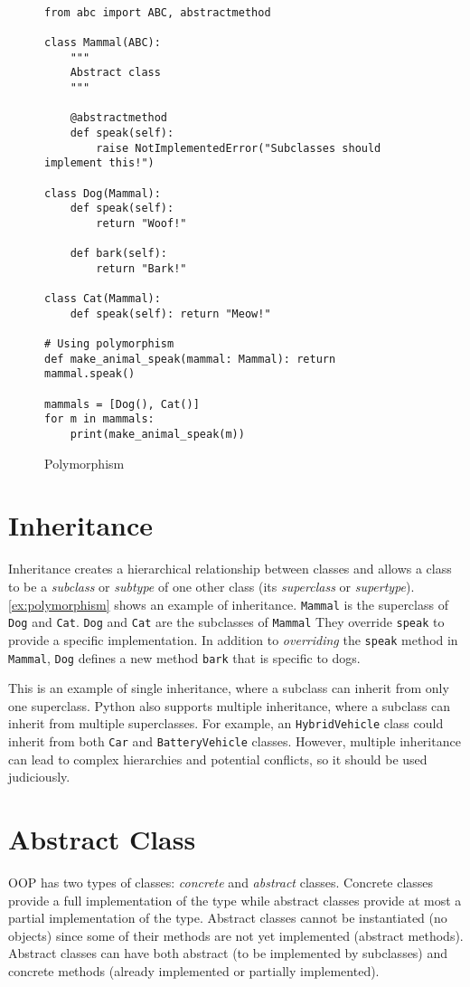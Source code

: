 \documentclass[oneside,11pt,dvipsnames]{book}
\newcommand{\code}[1]{\texttt{#1}}
\begin{document}
\begin{figure}
\begin{lstlisting}

from abc import ABC, abstractmethod

class Mammal(ABC):
    """
    Abstract class
    """
    
    @abstractmethod
    def speak(self):
        raise NotImplementedError("Subclasses should implement this!")

class Dog(Mammal):
    def speak(self):
        return "Woof!"

    def bark(self):
        return "Bark!"

class Cat(Mammal):
    def speak(self): return "Meow!"
        
# Using polymorphism
def make_animal_speak(mammal: Mammal): return mammal.speak()

mammals = [Dog(), Cat()]
for m in mammals:
    print(make_animal_speak(m))
\end{lstlisting}
\caption{Polymorphism}\label{ex:polymorphism}
\end{figure}

\section{Inheritance}

Inheritance creates a hierarchical relationship between classes and allows a class to be a \emph{subclass} or \emph{subtype} of one other class (its \emph{superclass} or \emph{supertype}).
\autoref{ex:polymorphism} shows an example of inheritance.
\code{Mammal} is the superclass of \code{Dog} and \code{Cat}.
\code{Dog} and \code{Cat} are the subclasses of \code{Mammal}
They override \code{speak} to provide a specific implementation.
In addition to \emph{overriding} the \code{speak} method in \code{Mammal}, \code{Dog} defines a new method \code{bark} that is specific to dogs.


This is an example of single inheritance, where a subclass can inherit from only one superclass. Python also supports multiple inheritance, where a subclass can inherit from multiple superclasses. For example, an \code{HybridVehicle} class could inherit from both \code{Car} and \code{BatteryVehicle} classes. However, multiple inheritance can lead to complex hierarchies and potential conflicts, so it should be used judiciously.

\section{Abstract Class}
OOP has two types of classes: \emph{concrete} and \emph{abstract} classes. Concrete classes provide a full implementation of the type while abstract classes provide at most a partial implementation of the type. Abstract classes cannot be instantiated (no objects) since some of their methods are not yet implemented (abstract methods). Abstract classes can have both abstract (to be implemented by subclasses) and concrete methods (already implemented or partially implemented). 
\end{document}
